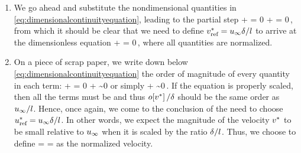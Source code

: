 \begin{enumerate}
\item We go ahead and substitute the nondimensional quantities in \cref{eq:dimensionalcontinuityequation}, leading to the partial step
\beq
\xpd{\left(\ndvelx\fsvel\right)}{\left(\ndposx\length\right)} + 
 = 0\implies
%
\dfrac{\fsvel}{\length}\xpd{\ndvelx}{\ndposx} + 
\xpd{\ndvely}{\ndposy} = 0\,,
\eeq
from which it should be clear that we need to define $v^*_\text{ref} = u_{\infty}\delta/l$ to arrive at the dimensionless equation
\bneq\label{eq:dimensionlesscontinuityequation}
\ipd\ndposx\ndvelx + \ipd\ndposy\ndvely = 0\,,
\eneq
where all quantities are normalized.
%
\item On a piece of scrap paper, we write down below \cref{eq:dimensionalcontinuityequation} the order of magnitude of every quantity in each term:
\beq
\dfrac{\fsvel}{\length}\xpd{\ndvelx}{\ndposx} + 
\xpd{\ndvely}{\ndposy} = 0\implies
%
\dfrac{\fsvel}{\length} + \dfrac{\lilo\vely}{\blthck}\sim 0
\eeq
or simply
\beq
\dfrac{\fsvel}{\length} + \dfrac{\lilo\vely}{\blthck}\sim 0\,.
\eeq
If the equation is properly scaled, then all the terms must be  and thus $o\!\left[{v^*}\right]/\delta$ should be the same order as $u_{\infty}/l$. Hence, once again, we come to the conclusion of the need to choose $u^*_\text{ref} = u_{\infty}\delta/l$. In other words, we expect the magnitude of the velocity $v^*$ to be small relative to $u_{\infty}$ when it is scaled by the ratio $\delta/l$. Thus, we choose to define
\bneq\label{eq:scalingyvelocity}
\ndvely =  
        = \dfrac{\length}{\blthck}\dfrac{\vely}{\fsvel}
\eneq
as the normalized velocity.


\end{enumerate}
